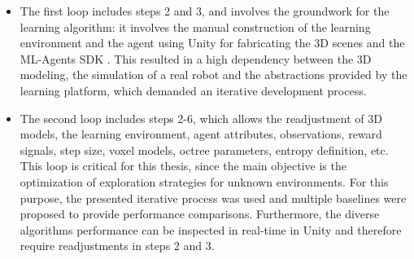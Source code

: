 \begin{itemize}
    \item The first loop includes steps 2 and 3, and involves the groundwork for the learning algorithm: it involves the manual construction of the learning environment and the agent using Unity \cite{unity2021} for fabricating the 3D scenes and the ML-Agents SDK \cite{github-unity-mlagents-toolkit}. This resulted in a high dependency between the 3D modeling, the simulation of a real robot and the  abstractions provided by the learning platform, which demanded an iterative development process.
    
    \item The second loop includes steps 2-6, which allows the readjustment of 3D models, the learning environment, agent attributes, observations, reward signals, step size, voxel models, octree parameters, entropy definition, etc. This loop is critical for this thesis, since the main objective is the optimization of exploration strategies for unknown environments. For this purpose, the presented iterative process was used and multiple baselines were proposed to provide performance comparisons. Furthermore, the diverse algorithms performance can be inspected in real-time in Unity and therefore require readjustments in steps 2 and 3.

\end{itemize}

%  
